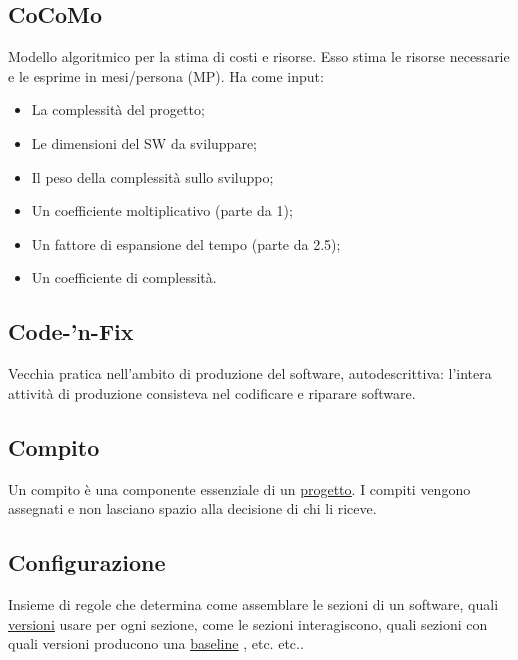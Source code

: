 	\subsection{CoCoMo}
	\label{sec:cocomo}
	Modello algoritmico per la stima di costi e risorse. Esso stima le risorse necessarie e le esprime in mesi/persona (MP). Ha come input:
	\begin{itemize}  
	\item La complessità del progetto;
	\item Le dimensioni del SW da sviluppare;
	\item Il peso della complessità sullo sviluppo;
	\item Un coefficiente moltiplicativo (parte da 1);
	\item Un fattore di espansione del tempo (parte da 2.5);
	\item Un coefficiente di complessità.
	\end{itemize}		

	\subsection{Code-'n-Fix}
	\label{sec:codenfix}
	Vecchia pratica nell'ambito di produzione del software, autodescrittiva: l'intera attività di produzione consisteva nel codificare e riparare software.
	
	\subsection{Compito}
	\label{sec:compiti}
	Un compito è una componente essenziale di un \underline{\hyperref[sec:progetto]{progetto}}. I compiti vengono assegnati e non lasciano spazio alla decisione di chi li riceve.
	
	\subsection{Configurazione}
	\label{sec:configurazione}
	Insieme di regole che determina come assemblare le sezioni di un software, quali \underline{\hyperref[sec:versione]{versioni}} usare per ogni sezione, come le sezioni interagiscono, quali sezioni con quali versioni producono una \underline{\hyperref[sec:baseline]{baseline}} , etc. etc..
	
